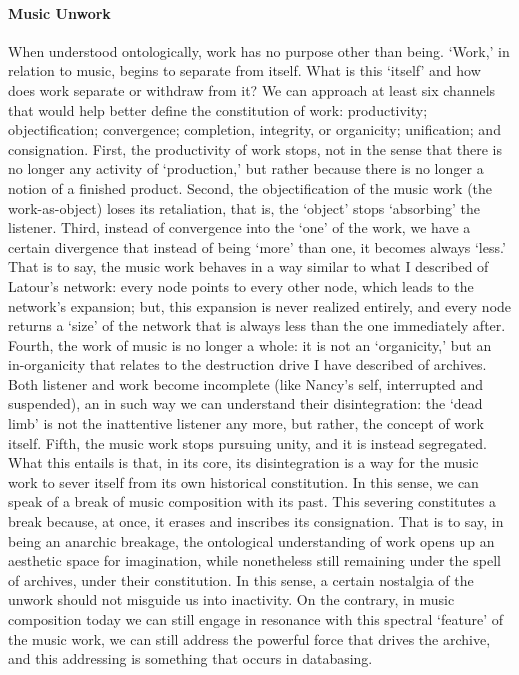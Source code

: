 \paragraph{Music Unwork}
When understood ontologically, work has no purpose other than being. `Work,' in relation to music, begins to separate from itself. What is this `itself' and how does work separate or withdraw from it? We can approach at least six channels that would help better define the constitution of work: productivity; objectification; convergence; completion, integrity, or organicity; unification; and consignation. First, the productivity of work stops, not in the sense that there is no longer any activity of `production,' but rather because there is no longer a notion of a finished product. Second, the objectification of the music work (the work-as-object) loses its retaliation, that is, the `object' stops `absorbing' the listener. Third, instead of convergence into the `one' of the work, we have a certain divergence that instead of being `more' than one, it becomes always `less.' That is to say, the music work behaves in a way similar to what I described of Latour's network: every node points to every other node, which leads to the network's expansion; but, this expansion is never realized entirely, and every node returns a `size' of the network that is always less than the one immediately after. Fourth, the work of music is no longer a whole: it is not an `organicity,' but an in-organicity that relates to the destruction drive I have described of archives. Both listener and work become incomplete (like Nancy's self, interrupted and suspended), an in such way we can understand their disintegration: the `dead limb' is not the inattentive listener any more, but rather, the concept of work itself. Fifth, the music work stops pursuing unity, and it is instead segregated. What this entails is that, in its core, its disintegration is a way for the music work to sever itself from its own historical constitution. In this sense, we can speak of a break of music composition with its past. This severing constitutes a break because, at once, it erases and inscribes its consignation. That is to say, in being an anarchic breakage, the ontological understanding of work opens up an aesthetic space for imagination, while nonetheless still remaining under the spell of archives, under their constitution. In this sense, a certain nostalgia of the unwork should not misguide us into inactivity. On the contrary, in music composition today we can still engage in resonance with this spectral `feature' of the music work, we can still address the powerful force that drives the archive, and this addressing is something that occurs in databasing.

